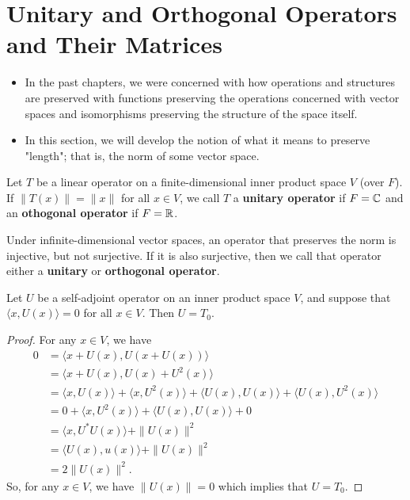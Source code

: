 \section{Unitary and Orthogonal Operators and Their Matrices}

\begin{itemize}
    \item In the past chapters, we were concerned with how operations and structures are preserved with functions preserving the operations concerned with vector spaces and isomorphisms preserving the structure of the space itself. 
    \item In this section, we will develop the notion of what it means to preserve "length"; that is, the norm of some vector space.
\end{itemize}

\begin{definition}
    Let \( T  \) be a linear operator on a finite-dimensional inner product space \( V  \) (over \( F  \)). If \( \|T(x)\| = \|x\| \) for all \( x \in V  \), we call \( T  \) a \textbf{unitary operator} if \( F = \mathbb{C}  \) and an \textbf{othogonal operator} if \( F = \mathbb{R}  \).
\end{definition}

\begin{remark}
    Under infinite-dimensional vector spaces, an operator that preserves the norm is injective, but not surjective. If it is also surjective, then we call that operator either a \textbf{unitary} or \textbf{orthogonal operator}. 
\end{remark}

\begin{lemma}
    Let \( U  \) be a self-adjoint operator on an inner product space \( V  \), and suppose that \( \langle x  , U(x) \rangle = 0  \) for all \( x \in V  \). Then \( U = {T}_{0} \).
\end{lemma}
\begin{proof}
For any \( x \in V  \), we have
\begin{align*}
    0 &= \langle x + U(x) , U(x + U(x)) \rangle \\
      &= \langle x + U(x)  , U(x) + U^{2}(x) \rangle \\
      &= \langle  x  , U(x) \rangle + \langle x  , U^{2}(x) \rangle + \langle U(x) , U(x) \rangle + \langle U(x) , U^{2}(x) \rangle \\
      &= 0 + \langle x  , U^{2}(x) \rangle + \langle U(x) , U(x) \rangle + 0 \\
      &= \langle x  , U^{*}U(x) \rangle + \|U(x)\|^{2} \\
      &= \langle U(x) , u(x) \rangle + \|U(x)\|^{2} \\
      &= 2\|U(x)\|^{2}. 
\end{align*}
So, for any \( x \in V  \), we have \( \|U(x)\| = 0  \) which implies that \( U = {T}_{0} \).
\end{proof}

